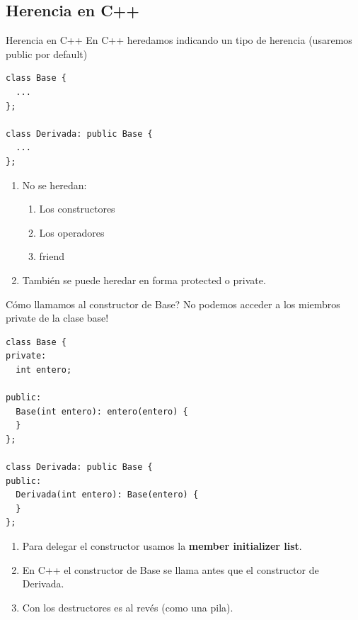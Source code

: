 \subsection{Herencia en C++}

\begin{frame}{Herencia en C++}{
En C++ heredamos indicando un tipo de herencia (usaremos public por default)\newline
   }
   \begin{lstlisting}[style=normal,firstnumber=1,linebackgroundcolor={%
           \btLstHLB<1>{5}%
   }]
class Base {
  ...
};

class Derivada: public Base {
  ...
};

   \end{lstlisting}
   \begin{enumerate}
      \item No se heredan:
      \begin{enumerate}
         \item Los constructores
         \item Los operadores
         \item friend
      \end{enumerate}
      \item Tambi\'en se puede heredar en forma protected o private.
   \end{enumerate}

\end{frame}

\begin{frame}{\textquestiondown C\'omo llamamos al constructor de Base?}{
  \textexclamdown No podemos acceder a los miembros private de la clase base!
}
   \begin{lstlisting}[style=normal,firstnumber=1]
class Base {
private:
  int entero;

public:
  Base(int entero): entero(entero) {
  }
};

class Derivada: public Base {
public:
  Derivada(int entero): Base(entero) {
  }
};

   \end{lstlisting}
   \begin{enumerate}
      \item Para delegar el constructor usamos la \textbf{member initializer list}.
      \item En C++ el constructor de Base se llama antes que el constructor de Derivada.
      \item Con los destructores es al rev\'es (como una pila).
   \end{enumerate}

\end{frame}

